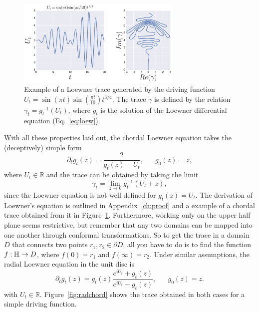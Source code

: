 \begin{figure}[b]
\begin{center}
    \includegraphics[width=0.7\textwidth]{chapters/ch4-sle/figs/leexample}
\end{center}
\caption{Example of a Loewner trace generated by the driving function
    $U_t=\sin(\pi t)\sin(\frac{\pi t}{10})t^{3/4}$. The trace $\gamma$ is
    defined by the relation $\gamma_t = g_t^{-1}(U_t)$, where $g_t$ is the
    solution of the Loewner differential equation (Eq.~\ref{eq:loew}).}
\label{fig:leexample}
\end{figure}


With all these properties laid out, the chordal Loewner equation takes the
(deceptively) simple form 
\begin{equation}
    \label{eq:loew}
    \partial_t g_t(z) = \frac{2}{g_t(z) - U_t}
    ,\,\,\,\,\,\,\,\,\,\,
    g_0(z)=z,
\end{equation}
where $U_t\in\mathbb{R}$ and the trace can be obtained by taking the limit
\begin{equation}
    \gamma_t = \lim_{z\rightarrow 0}g_t^{-1}\left(U_t + z\right),
\end{equation}
since the Loewner equation is not well defined for $g_t(z)=U_t$. The derivation
of Loewner's equation is outlined in Appendix~\ref{ch:proof} and a example of a
chordal trace obtained from it in Figure~\ref{fig:leexample}. Furthermore,
working only on the upper half plane seems restrictive, but remember that any
two domains can be mapped into one another through conformal transformations.
So to get the trace in a domain $D$ that connects two points $r_1, r_2 \in
\partial D$, all you have to do is to find the function $f:\mathbb{H}\rightarrow D$,
where $f(0)=r_1$ and $f(\infty)=r_2$. Under similar assumptions, the radial
Loewner equation in the unit disc is
\begin{equation}
    \partial_{t}g_{t}\left(z\right)=
    g_{t}\left(z\right)
    \frac{e^{iU_{t}}+g_{t}\left(z\right)}
         {e^{iU_{t}}-g_{t}\left(z\right)}
    ,\,\,\,\,\,\,\,\,\,\,
    g_0(z)=z.
\end{equation}
with $U_t\in\mathbb{R}$. Figure~\ref{fig:radchord} shows the trace
obtained in both cases for a simple driving function.

